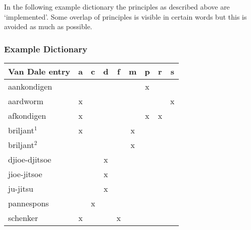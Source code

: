 In the following example dictionary the principles as described above are
`implemented'. Some overlap of principles is visible in certain words but this 
is avoided as much as possible.

\subsubsection{Example Dictionary}

\begin{tabular}{|l||c|c|c|c|c|c|c|c||}    \hline
  Van Dale entry   &a&c&d&f&m&p&r&s     \\ \hline
  aankondigen      & & & & & &x& &      \\
  aardworm         &x& & & & & & &x     \\
  afkondigen       &x& & & & &x&x&      \\
  briljant$^1$     &x& & & &x& & &      \\
  briljant$^2$     & & & & &x& & &      \\
  djioe-djitsoe    & & &x& & & & &      \\
  jioe-jitsoe      & & &x& & & & &      \\
  ju-jitsu         & & &x& & & & &      \\
  pannespons       & &x& & & & & &      \\
  schenker         &x& & &x& & & &      \\ \hline
\end{tabular}
\hspace{1cm}

